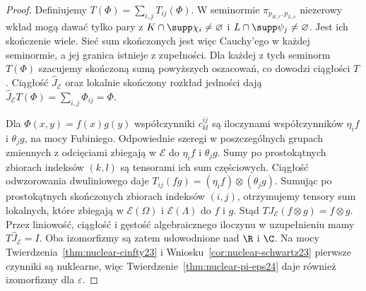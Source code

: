 \begin{proof}
Definiujemy $T(\Phi)=\sum_{i,j}T_{ij}(\Phi)$.
W seminormie $\pi_{p_{K,r},p_{L,s}}$ niezerowy wkład
mogą dawać tylko pary z
$K\cap\supp\chi_i\ne\varnothing$ i
$L\cap\supp\psi_j\ne\varnothing$.
Jest ich skończenie wiele. Sieć sum skończonych
jest więc Cauchy'ego w każdej seminormie, a jej
granica istnieje z zupełności.
Dla każdej z tych seminorm $T(\Phi)$ szacujemy
skończoną sumą powyższych oszacowań, co dowodzi
ciągłości $T$. Ciągłość $\widehat J_{\mathcal E}$
oraz lokalnie skończony rozkład jedności dają
$\widehat J_{\mathcal E}T(\Phi)=\sum_{i,j}\Phi_{ij}=\Phi$.

Dla $\Phi(x,y)=f(x)g(y)$ współczynniki $c_{kl}^{ij}$
są iloczynami współczynników $\eta_i f$ i $\theta_j g$,
na mocy Fubiniego. Odpowiednie szeregi w poszczególnych grupach zmiennych
z odcięciami zbiegają w $\mathcal E$
do $\eta_i f$ i $\theta_j g$. Sumy po prostokątnych
zbiorach indeksów $(k,l)$ są tensorami ich sum
częściowych. Ciągłość odwzorowania dwuliniowego
daje $T_{ij}(fg)=(\eta_i f)\otimes(\theta_j g)$.
Sumując po prostokątnych skończonych zbiorach
indeksów $(i,j)$, otrzymujemy tensory sum lokalnych,
które zbiegają w $\mathcal E(\Omega)$ i
$\mathcal E(\Lambda)$ do $f$ i $g$.
Stąd $T J_{\mathcal E}(f\otimes g)=f\otimes g$.
Przez liniowość, ciągłość i gęstość algebraicznego
iloczynu w uzupełnieniu mamy $T\widehat J_{\mathcal E}=I$.
Oba izomorfizmy są zatem udowodnione nad $\R$ i $\C$.
Na mocy Twierdzenia~\ref{thm:nuclear-cinfty23}
i Wniosku~\ref{cor:nuclear-schwartz23} pierwsze
czynniki są nuklearne, więc
Twierdzenie~\ref{thm:nuclear-pi-eps24}
daje również izomorfizmy dla $\varepsilon$.
\end{proof}
